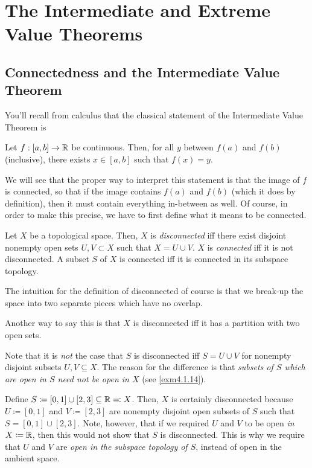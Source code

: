 \section{The Intermediate and Extreme Value Theorems}

\subsection{Connectedness and the Intermediate Value Theorem}

You'll recall from calculus that the classical statement of the Intermediate Value Theorem is
\begin{footnoteequation}
\begin{textequation}
Let $f:[a,b]\rightarrow \mathbb{R}$ be continuous.  Then, for all $y$ between $f(a)$ and $f(b)$ (inclusive), there exists $x\in [a,b]$ such that $f(x)=y$.
\end{textequation}
\end{footnoteequation}
We will see that the proper way to interpret this statement is that the image of $f$ is connected, so that if the image contains $f(a)$ and $f(b)$ (which it does by definition), then it must contain everything in-between as well.  Of course, in order to make this precise, we have to first define what it means to be connected.
\begin{dfn}\label{Connected}
Let $X$ be a topological space.  Then, $X$ is \emph{disconnected} iff there exist disjoint nonempty open sets $U,V\subset X$ such that $X=U\cup V$.  $X$ is \emph{connected} iff it is not disconnected.  A subset $S$ of $X$ is connected iff it is connected in its subspace topology.
\begin{rmk}
The intuition for the definition of disconnected of course is that we break-up the space into two separate pieces which have no overlap.
\end{rmk}
\begin{rmk}
Another way to say this is that $X$ is disconnected iff it has a partition with two open sets.
\end{rmk}
\begin{rmk}
Note that it is \emph{not} the case that $S$ is disconnected iff $S=U\cup V$ for nonempty disjoint subsets $U,V\subseteq X$.  The reason for the difference is that \emph{subsets of $S$ which are open in $S$ need not be open in $X$} (see \cref{exm4.1.14}).
\end{rmk}
\end{dfn}
\begin{exm}
Define $S\coloneqq [0,1]\cup [2,3]\subseteq \mathbb{R} \eqqcolon X$.  Then, $X$ is certainly disconnected because $U\coloneqq [0,1]$ and $V\coloneqq [2,3]$ are nonempty disjoint open subsets of $S$ such that $S=[0,1]\cup [2,3]$.  Note, however, that if we required $U$ and $V$ to be open \emph{in $X\coloneqq \mathbb{R}$}, then this would not show that $S$ is disconnected.  This is why we require that $U$ and $V$ are \emph{open in the subspace topology of $S$}, instead of open in the ambient space.
\end{exm}
